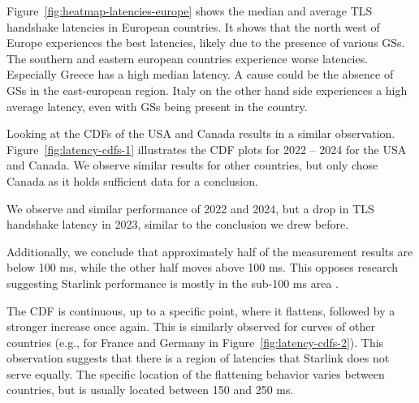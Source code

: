 Figure~\ref{fig:heatmap-latencies-europe} shows the median and average TLS
handshake latencies in European countries. It shows that the north west of
Europe experiences the best latencies, likely due to the presence of various
\ac{GS}s. The southern and eastern european countries experience worse
latencies. Especially Greece has a high median latency. A cause could be the
absence of \ac{GS}s in the east-european region. Italy on the other hand side
experiences a high average latency, even with \ac{GS}s being present in the
country.

Looking at the CDFs of the USA and Canada results in a similar observation.
Figure~\ref{fig:latency-cdfs-1} illustrates the CDF plots for 2022 -- 2024
for the USA and Canada. We observe similar results for other countries, but
only chose Canada as it holds sufficient data for a conclusion.

We observe and similar performance of 2022 and 2024, but a drop in TLS
handshake latency in 2023, similar to the conclusion we drew before.

Additionally, we conclude that approximately half of the measurement results
are below 100 ms, while the other half moves above 100 ms. This opposes
research suggesting Starlink performance is mostly in the sub-100 ms area
\cite{DBLP:conf/www/MohanFCBRMO24, DBLP:conf/icnp/LaiLL20,
	DBLP:journals/pacmnet/RamanVCSZ23, DBLP:conf/imc/MichelTGB22}.

The CDF is continuous, up to a specific point, where it flattens, followed by a
stronger increase once again. This is similarly observed for curves of other
countries (e.g., for France and Germany in Figure~\ref{fig:latency-cdfs-2}).
This observation suggests that there is a region of latencies that Starlink
does not serve equally. The specific location of the flattening behavior varies
between countries, but is usually located between 150 and 250 ms.

